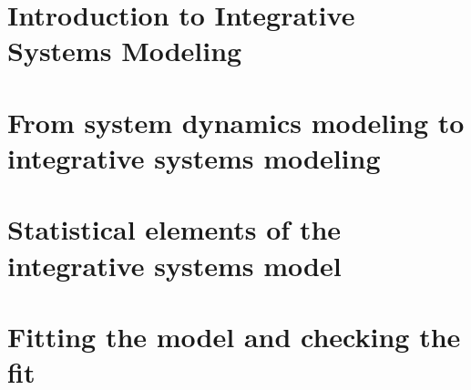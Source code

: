 \chapter[Introduction to ISM]{Introduction to Integrative Systems Modeling}
\label{chapter:theory-introduction}


\chapter[System dynamics model]{From system dynamics modeling to integrative systems modeling}
\label{chapter:system-dynamics}



\chapter[Statistical model]{Statistical elements of the integrative systems model}
\label{chapter:statistical-model}





\chapter[Model fitting]{Fitting the model and checking the fit}
\label{chapter:model-fitting}



